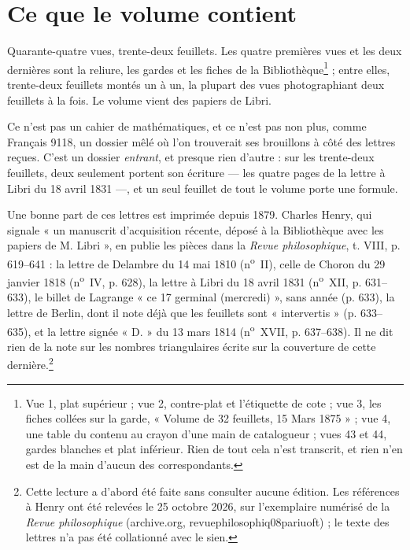 \documentclass[11pt,a4paper]{article}
\begin{document}
\begin{resume}
\end{resume}

\section*{Ce que le volume contient}

Quarante-quatre vues, trente-deux feuillets. Les quatre premières vues et les
deux dernières sont la reliure, les gardes et les fiches de la
Bibliothèque\footnote{Vue 1, plat supérieur ; vue 2, contre-plat et l'étiquette
de cote ; vue 3, les fiches collées sur la garde, « Volume de 32 feuillets,
15 Mars 1875 » ; vue 4, une table du contenu au crayon d'une main de
catalogueur ; vues 43 et 44, gardes blanches et plat inférieur. Rien de tout
cela n'est transcrit, et rien n'en est de la main d'aucun des correspondants.} ;
entre elles, trente-deux feuillets montés un à un, la plupart des vues
photographiant deux feuillets à la fois. Le volume vient des papiers de Libri.

Ce n'est pas un cahier de mathématiques, et ce n'est pas non plus, comme
Français 9118, un dossier mêlé où l'on trouverait ses brouillons à côté des
lettres reçues. C'est un dossier \emph{entrant}, et presque rien d'autre : sur
les trente-deux feuillets, deux seulement portent son écriture — les quatre
pages de la lettre à Libri du 18 avril 1831 —, et un seul feuillet de tout le
volume porte une formule.

Une bonne part de ces lettres est imprimée depuis 1879. Charles Henry, qui
signale « un manuscrit d'acquisition récente, déposé à la Bibliothèque avec
les papiers de M. Libri », en publie les pièces dans la \emph{Revue
philosophique}, t. VIII, p. 619--641 : la lettre de Delambre du 14 mai 1810
(n\textsuperscript{o}~II), celle de Choron du 29 janvier 1818
(n\textsuperscript{o}~IV, p. 628), la lettre à Libri du 18 avril 1831
(n\textsuperscript{o}~XII, p. 631--633), le billet de Lagrange « ce 17
germinal (mercredi) », sans année (p. 633), la lettre de Berlin, dont il note
déjà que les feuillets sont « intervertis » (p. 633--635), et la lettre signée
« D. » du 13 mars 1814 (n\textsuperscript{o}~XVII, p. 637--638). Il ne dit rien
de la note sur les nombres triangulaires écrite sur la couverture de cette
dernière.\footnote{Cette lecture a d'abord été faite sans consulter aucune
édition. Les références à Henry ont été relevées le 25 octobre 2026, sur
l'exemplaire numérisé de la \emph{Revue philosophique} (archive.org,
revuephilosophiq08pariuoft) ; le texte des lettres n'a pas été collationné
avec le sien.}
\end{document}
